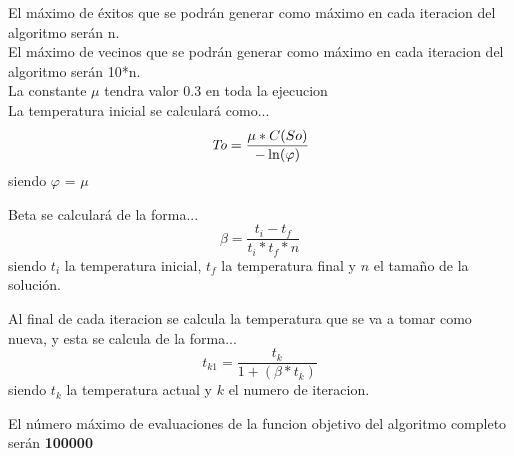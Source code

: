 \documentclass{article}
\begin{document}
El máximo de éxitos que se podrán generar como máximo en cada iteracion del algoritmo serán n.\\
El máximo de vecinos que se podrán generar como máximo en cada iteracion del algoritmo serán 10*n.\\
La constante $\mu$ tendra valor 0.3 en toda la ejecucion \\
La temperatura inicial se calculará como... 
\begin{equation}
  \emph{To} = \frac{ \mu * C(So)  }{ - \ln( \varphi  )   }
\end{equation}
\newline siendo $\varphi$ = $\mu$

\vspace {5mm}
Beta se calculará de la forma...
\begin{equation}
  \beta = \frac{ t_i - t_f }{ t_i * t_f * n  }
\end{equation}
\newline siendo $t_i$ la temperatura inicial, $t_f$ la temperatura final y $n$ el tamaño de la solución.
\vspace {5mm}

Al final de cada iteracion se calcula la temperatura que se va a tomar como nueva, y esta 
se calcula de la forma...
\begin{equation}
  t_{k1} = \frac{ t_k }{ 1 + (\beta * t_k) }
\end{equation}
\newline siendo $t_k$ la temperatura actual y $k$ el numero de iteracion.

El número máximo de evaluaciones de la funcion objetivo del algoritmo completo serán \textbf{100000}
\end{document}
